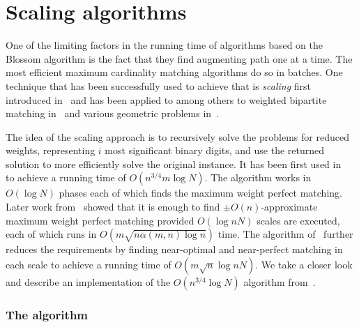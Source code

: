 \section{Scaling algorithms}

One of the limiting factors in the running time of algorithms based on the Blossom algorithm is the fact that they find augmenting path one at a time. The most efficient maximum cardinality matching algorithms do so in batches. One technique that has been successfully used to achieve that is \textit{scaling} first introduced in~\cite{edmonds1972theoretical} and has been applied to among others to weighted bipartite matching in~\cite{gabow1989faster} and various geometric problems in~\cite{gabow1984scaling}. 

The idea of the scaling approach is to recursively solve the problems for reduced weights, representing $i$ most significant binary digits, and use the returned solution to more efficiently solve the original instance. It has been first used in~\cite{gabow1985scaling} to achieve a running time of $O(n^{3/4}m \log N)$. The algorithm works in $O(\log N)$ phases each of which finds the maximum weight perfect matching. Later work from~\cite{gabow1991faster} showed that it is enough to find $\pm O(n)$-approximate maximum weight perfect matching provided $O(\log nN)$ scales are executed, each of which runs in $O(m\sqrt{n \alpha(m,n)\log n})$ time. The algorithm of~\cite{duan2018scaling} further reduces the requirements by finding near-optimal and near-perfect matching in each scale to achieve a running time of $O(m \sqrt{n} \log nN)$. We take a closer look and describe an implementation of the $O(n^{3/4}\log N)$ algorithm from~\cite{gabow1985scaling}.

\subsubsection{The algorithm}

